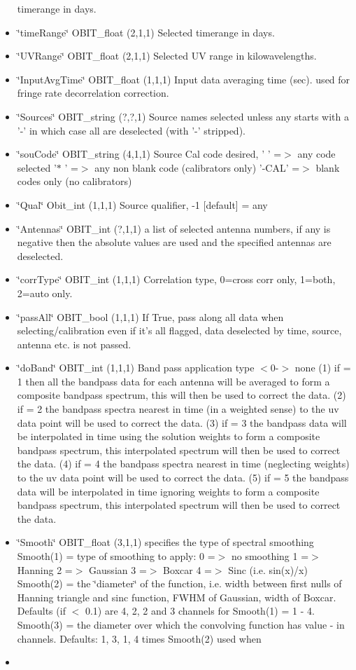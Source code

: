 \begin{itemize}
timerange in days. \item \char`\"{}time\-Range\char`\"{} OBIT\_\-float (2,1,1) Selected timerange in days. \item \char`\"{}UVRange\char`\"{} OBIT\_\-float (2,1,1) Selected UV range in kilowavelengths. \item \char`\"{}Input\-Avg\-Time\char`\"{} OBIT\_\-float (1,1,1) Input data averaging time (sec). used for fringe rate decorrelation correction. \item \char`\"{}Sources\char`\"{} OBIT\_\-string (?,?,1) Source names selected unless any starts with a '-' in which case all are deselected (with '-' stripped). \item \char`\"{}sou\-Code\char`\"{} OBIT\_\-string (4,1,1) Source Cal code desired, ' ' =$>$ any code selected '$\ast$ ' =$>$ any non blank code (calibrators only) '-CAL' =$>$ blank codes only (no calibrators) \item \char`\"{}Qual\char`\"{} Obit\_\-int (1,1,1) Source qualifier, -1 [default] = any \item \char`\"{}Antennas\char`\"{} OBIT\_\-int (?,1,1) a list of selected antenna numbers, if any is negative then the absolute values are used and the specified antennas are deselected. \item \char`\"{}corr\-Type\char`\"{} OBIT\_\-int (1,1,1) Correlation type, 0=cross corr only, 1=both, 2=auto only. \item \char`\"{}pass\-All\char`\"{} OBIT\_\-bool (1,1,1) If True, pass along all data when selecting/calibration even if it's all flagged, data deselected by time, source, antenna etc. is not passed. \item \char`\"{}do\-Band\char`\"{} OBIT\_\-int (1,1,1) Band pass application type $<$0-$>$ none (1) if = 1 then all the bandpass data for each antenna will be averaged to form a composite bandpass spectrum, this will then be used to correct the data. (2) if = 2 the bandpass spectra nearest in time (in a weighted sense) to the uv data point will be used to correct the data. (3) if = 3 the bandpass data will be interpolated in time using the solution weights to form a composite bandpass spectrum, this interpolated spectrum will then be used to correct the data. (4) if = 4 the bandpass spectra nearest in time (neglecting weights) to the uv data point will be used to correct the data. (5) if = 5 the bandpass data will be interpolated in time ignoring weights to form a composite bandpass spectrum, this interpolated spectrum will then be used to correct the data. \item \char`\"{}Smooth\char`\"{} OBIT\_\-float (3,1,1) specifies the type of spectral smoothing Smooth(1) = type of smoothing to apply: 0 =$>$ no smoothing 1 =$>$ Hanning 2 =$>$ Gaussian 3 =$>$ Boxcar 4 =$>$ Sinc (i.e. sin(x)/x) Smooth(2) = the \char`\"{}diameter\char`\"{} of the function, i.e. width between first nulls of Hanning triangle and sinc function, FWHM of Gaussian, width of Boxcar. Defaults (if $<$ 0.1) are 4, 2, 2 and 3 channels for Smooth(1) = 1 - 4. Smooth(3) = the diameter over which the convolving function has value - in channels. Defaults: 1, 3, 1, 4 times Smooth(2) used when \item 
\end{itemize}
